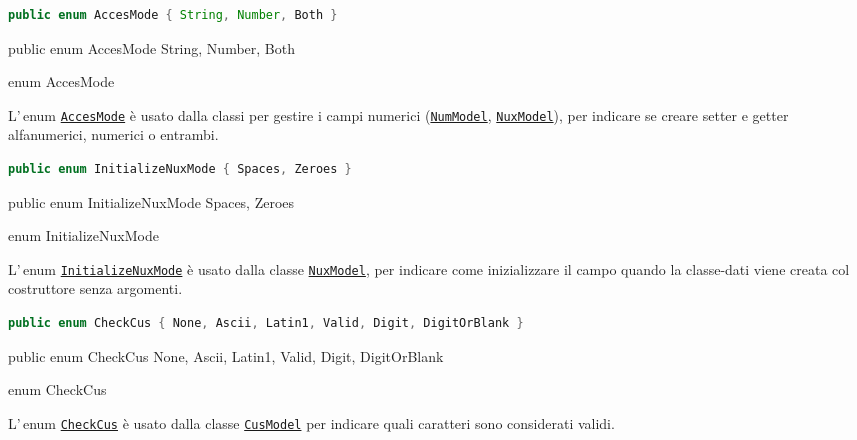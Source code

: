 \ifesource
\begin{lstlisting}[language=java, 
caption=enum AccesMode, 
label=lst:AccesMode]
public enum AccesMode { String, Number, Both }
\end{lstlisting}
\else
\begin{elisting}
\begin{javacode}
public enum AccesMode { String, Number, Both }
\end{javacode}
\caption{enum AccesMode}\label{lst:AccesMode}
\end{elisting}
\fi
L'\,enum \hyperref[lst:AccesMode]{\texttt{AccesMode}} è usato 
dalla classi per gestire i campi numerici 
(\hyperref[lst:NumModel]{\texttt{NumModel}},
\hyperref[lst:NuxModel]{\texttt{NuxModel}}), per indicare se creare setter e
getter alfanumerici, numerici o entrambi.


\ifesource
\begin{lstlisting}[language=java, 
caption=enum InitializeNuxMode, 
label=lst:InitializeNuxMode]
public enum InitializeNuxMode { Spaces, Zeroes }
\end{lstlisting}
\else
\begin{elisting}
\begin{javacode}
public enum InitializeNuxMode { Spaces, Zeroes }
\end{javacode}
\caption{enum InitializeNuxMode}\label{lst:InitializeNuxMode}
\end{elisting}
\fi
L'\,enum \hyperref[lst:InitializeNuxMode]{\texttt{InitializeNuxMode}} è usato 
dalla classe \hyperref[lst:NuxModel]{\texttt{NuxModel}}, per indicare come 
inizializzare il campo quando la classe-dati viene creata col costruttore senza
argomenti.

\ifesource
\begin{lstlisting}[language=java, 
caption=enum CheckCus, 
label=lst:CheckCus]
public enum CheckCus { None, Ascii, Latin1, Valid, Digit, DigitOrBlank }
\end{lstlisting}
\else
\begin{elisting}
\begin{javacode}
public enum CheckCus { None, Ascii, Latin1, Valid, Digit, DigitOrBlank }
\end{javacode}
\caption{enum CheckCus}\label{lst:CheckCus}
\end{elisting}
\fi
L'\,enum \hyperref[lst:CheckCus]{\texttt{CheckCus}} è usato dalla classe
\hyperref[lst:CusModel]{\texttt{CusModel}} per indicare quali caratteri sono
considerati validi.



